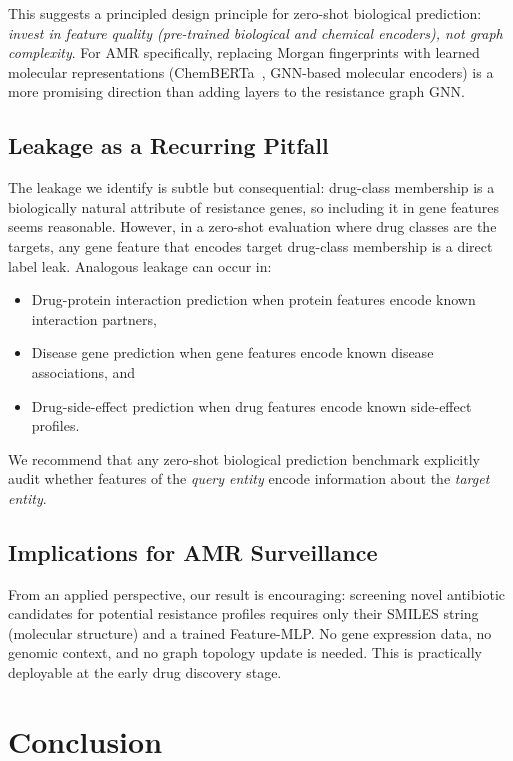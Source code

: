 \documentclass[conference]{IEEEtran}
\begin{document}
This suggests a principled design principle for zero-shot biological
prediction: \emph{invest in feature quality (pre-trained biological and chemical
encoders), not graph complexity}. For AMR specifically, replacing Morgan
fingerprints with learned molecular representations
(ChemBERTa~\cite{chithrananda2020chemberta}, GNN-based molecular encoders)
is a more promising direction than adding layers to the resistance graph GNN.

\subsection{Leakage as a Recurring Pitfall}
The leakage we identify is subtle but consequential: drug-class membership is
a biologically natural attribute of resistance genes, so including it in gene
features seems reasonable. However, in a zero-shot evaluation where drug
classes are the targets, any gene feature that encodes target drug-class
membership is a direct label leak. Analogous leakage can occur in:
\begin{itemize}
  \item Drug-protein interaction prediction when protein features encode known
    interaction partners,
  \item Disease gene prediction when gene features encode known disease
    associations, and
  \item Drug-side-effect prediction when drug features encode known
    side-effect profiles.
\end{itemize}
We recommend that any zero-shot biological prediction benchmark explicitly
audit whether features of the \emph{query entity} encode information about
the \emph{target entity}.

\subsection{Implications for AMR Surveillance}
From an applied perspective, our result is encouraging: screening novel
antibiotic candidates for potential resistance profiles requires only their
SMILES string (molecular structure) and a trained Feature-MLP. No gene
expression data, no genomic context, and no graph topology update is needed.
This is practically deployable at the early drug discovery stage.

\section{Conclusion}
\label{sec:conclusion}
\end{document}
